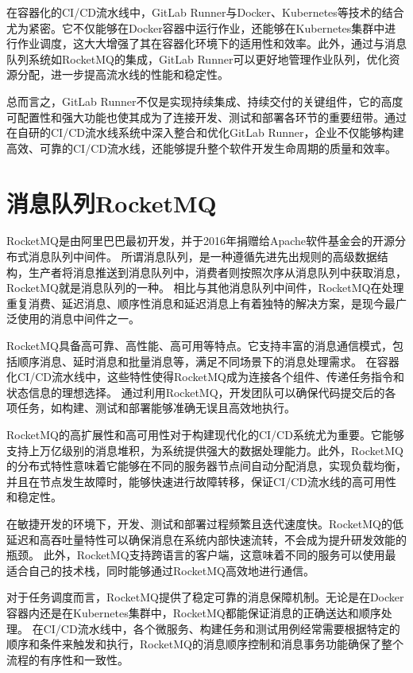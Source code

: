 在容器化的CI/CD流水线中，GitLab Runner与Docker、Kubernetes等技术的结合尤为紧密。它不仅能够在Docker容器中运行作业，还能够在Kubernetes集群中进行作业调度，这大大增强了其在容器化环境下的适用性和效率。此外，通过与消息队列系统如RocketMQ的集成，GitLab Runner可以更好地管理作业队列，优化资源分配，进一步提高流水线的性能和稳定性。

总而言之，GitLab Runner不仅是实现持续集成、持续交付的关键组件，它的高度可配置性和强大功能也使其成为了连接开发、测试和部署各环节的重要纽带。通过在自研的CI/CD流水线系统中深入整合和优化GitLab Runner，企业不仅能够构建高效、可靠的CI/CD流水线，还能够提升整个软件开发生命周期的质量和效率。


\section{消息队列RocketMQ}
RocketMQ是由阿里巴巴最初开发，并于2016年捐赠给Apache软件基金会的开源分布式消息队列中间件。
所谓消息队列，是一种遵循先进先出规则的高级数据结构，生产者将消息推送到消息队列中，消费者则按照次序从消息队列中获取消息，RocketMQ就是消息队列的一种。
相比与其他消息队列中间件，RocketMQ在处理重复消费、延迟消息、顺序性消息和延迟消息上有着独特的解决方案，是现今最广泛使用的消息中间件之一\cite{分布式消息系统研究综述}。

RocketMQ具备高可靠、高性能、高可用等特点。它支持丰富的消息通信模式，包括顺序消息、延时消息和批量消息等，满足不同场景下的消息处理需求\cite{RJSJ201811013}。
在容器化CI/CD流水线中，这些特性使得RocketMQ成为连接各个组件、传递任务指令和状态信息的理想选择\cite{1023416528.nh}。
通过利用RocketMQ，开发团队可以确保代码提交后的各项任务，如构建、测试和部署能够准确无误且高效地执行。

RocketMQ的高扩展性和高可用性对于构建现代化的CI/CD系统尤为重要。它能够支持上万亿级别的消息堆积，为系统提供强大的数据处理能力。此外，RocketMQ的分布式特性意味着它能够在不同的服务器节点间自动分配消息，实现负载均衡，并且在节点发生故障时，能够快速进行故障转移，保证CI/CD流水线的高可用性和稳定性。

在敏捷开发的环境下，开发、测试和部署过程频繁且迭代速度快。RocketMQ的低延迟和高吞吐量特性可以确保消息在系统内部快速流转，不会成为提升研发效能的瓶颈。
此外，RocketMQ支持跨语言的客户端，这意味着不同的服务可以使用最适合自己的技术栈，同时能够通过RocketMQ高效地进行通信。

对于任务调度而言，RocketMQ提供了稳定可靠的消息保障机制。无论是在Docker容器内还是在Kubernetes集群中，RocketMQ都能保证消息的正确送达和顺序处理。
在CI/CD流水线中，各个微服务、构建任务和测试用例经常需要根据特定的顺序和条件来触发和执行，RocketMQ的消息顺序控制和消息事务功能确保了整个流程的有序性和一致性\cite{1018841702.nh}。

